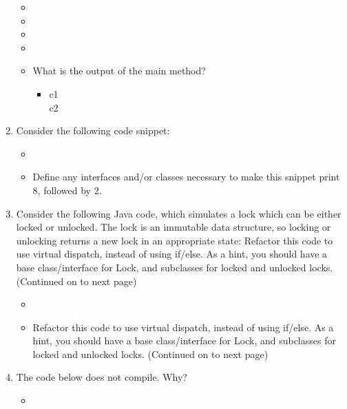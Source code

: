 \documentclass[12pt,a4paper]{article}
\begin{document}
\begin{enumerate}
\begin{itemize}
      \item[] 
      \item[] 
      \item[] 
      \item[] 
      \item[] What is the output of the main method? 
      \begin{itemize}
        \item[] c1\\c2
      \end{itemize} 
    \end{itemize}
    \clearpage
    \item Consider the following code snippet: %
    \begin{itemize}
      \item[] 
      \item[] Define any interfaces and/or classes necessary to make this snippet print 8, followed by 2. 
    \end{itemize}
    \clearpage
    \item Consider the following Java code, which simulates a lock which can be either locked or
    unlocked. The lock is an immutable data structure, so locking or unlocking returns a new lock
    in an appropriate state: Refactor this code to use virtual dispatch, instead of using if/else. As a hint, you should have a
    base class/interface for Lock, and subclasses for locked and unlocked locks. (Continued on to
    next page) %
    \begin{itemize}
      \item[] 
      \item[] Refactor this code to use virtual dispatch, instead of using if/else. As a hint, you should have a
      base class/interface for Lock, and subclasses for locked and unlocked locks. (Continued on to
      next page) 
    \end{itemize}
    \clearpage
    \item The code below does not compile. Why? %
    \begin{itemize}
      \item[] 

\end{itemize}
\end{enumerate}
\end{document}

